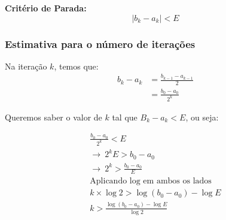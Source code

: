 \documentclass{article}
\begin{document}
        \textbf{Critério de Parada:}
        \[|b_k - a_k| < E\]

        \subsubsection*{Estimativa para o número de iterações}
        Na iteração $k$, temos que:
        \begin{align*}
            b_k - a_k &= \frac{b_{k-1} - a_{k-1}}{2}\\
            &= \frac{b_0 - a_0}{2^k}
        \end{align*}

        Queremos saber o valor de $k$ tal que $B_k - a_k < E$, ou seja:

        \begin{gather*}
            \frac{b_0 - a_0}{2^k} < E\\
            \rightarrow~2^k E > b_0 - a_0\\
            \rightarrow~2^k > \frac{b_0 - a_0}{E}\\
            \text{Aplicando log em ambos os lados}\\
            k \times \log{2} > \log{(b_0 - a_0)} - \log{E}\\
            \boxed{k > \frac{\log{(b_0 - a_0)} - \log{E}}{\log{2}}}
        \end{gather*}
\end{document}
